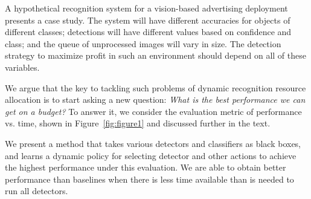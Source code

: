 A hypothetical recognition system for a vision-based advertising deployment presents a case study.
The system will have different accuracies for objects of different classes; detections will have different values based on confidence and class; and the queue of unprocessed images will vary in size.
The detection strategy to maximize profit in such an environment should depend on all of these variables.

We argue that the key to tackling such problems of dynamic recognition resource allocation is to start asking a new question:
\emph{What is the best performance we can get on a budget?}
To answer it, we consider the evaluation metric of performance vs. time, shown in Figure~\ref{fig:figure1} and discussed further in the text.

We present a method that takes various detectors and classifiers as black boxes, and learns a dynamic policy for selecting detector and other actions to achieve the highest performance under this evaluation.
We are able to obtain better performance than baselines when there is less time available than is needed to run all detectors.
